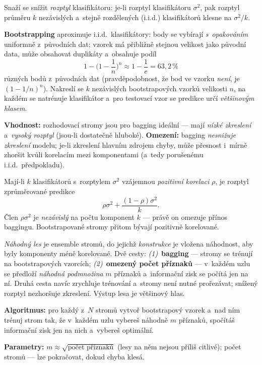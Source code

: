 \documentclass[11pt,a4paper]{article}
\theoremstyle{definition}
\begin{document}
\begin{defbox}
Snaží se snížit \emph{rozptyl} klasifikátoru: je-li rozptyl klasifikátoru $\sigma^2$, pak
rozptyl průměru $k$ nezávislých a~stejně rozdělených (i.i.d.) klasifikátorů klesne na
$\sigma^2/k$.

\textbf{Bootstrapping} aproximuje i.i.d.\ klasifikátory: body se vybírají \emph{s~opakováním}
uniformně z~původních dat; vzorek má přibližně stejnou velikost jako původní data, může
obsahovat duplikáty a~obsahuje podíl
\[ 1-\Big(1-\frac1n\Big)^{\!n}\approx 1-\frac1e=63{,}2\,\% \]
různých bodů z~původních dat (pravděpodobnost, že bod ve vzorku \emph{není}, je
$(1-1/n)^n$). Nakreslí se $k$ nezávislých bootstrapových vzorků velikosti $n$, na každém se
natrénuje klasifikátor a~pro testovací vzor se predikce určí \emph{většinovým hlasem}.

\textbf{Vhodnost:} rozhodovací stromy jsou pro bagging ideální --- mají \emph{nízké
zkreslení} a~\emph{vysoký rozptyl} (jsou-li dostatečně hluboké).
\textbf{Omezení:} bagging \emph{nesnižuje zkreslení} modelu; je-li zkreslení hlavním zdrojem
chyby, může přesnost i~mírně zhoršit kvůli korelacím mezi komponentami (a~tedy porušenému
i.i.d.\ předpokladu).
\end{defbox}

\begin{defbox}
Mají-li $k$ klasifikátorů s~rozptylem $\sigma^2$ vzájemnou \emph{pozitivní korelaci} $\rho$,
je rozptyl zprůměrované predikce
\[ \rho\sigma^2+\frac{(1-\rho)\sigma^2}{k}. \]
Člen $\rho\sigma^2$ je \emph{nezávislý} na počtu komponent $k$ --- právě on omezuje přínos
baggingu. Bootstrapované stromy přitom bývají pozitivně korelované.

\emph{Náhodný les} je ensemble stromů, do jejichž \emph{konstrukce} je vložena náhodnost, aby
byly komponenty méně korelované. Dvě cesty: \emph{(1)}~\textbf{bagging} --- stromy se trénují na
bootstrapových vzorcích; \emph{(2)}~\textbf{omezený počet příznaků} --- v~každém uzlu se předloží
\emph{náhodná podmnožina} $m$ příznaků a~informační zisk se počítá jen na ní. Druhá cesta navíc
zrychluje trénování a~stromy není nutné prořezávat; snížený rozptyl nezhoršuje zkreslení. Výstup
lesa je většinový hlas.

\textbf{Algoritmus:} pro každý z~$N$ stromů vytvoř bootstrapový vzorek a~nad ním trénuj strom
tak, že v~každém uzlu vybereš náhodně $m$ příznaků, spočítáš informační zisk jen na nich
a~vybereš optimální.

\textbf{Parametry:} $m\approx\sqrt{\text{počet příznaků}}$ (lesy na něm nejsou příliš citlivé);
počet stromů --- lze pokračovat, dokud chyba klesá.
\end{defbox}
\end{document}
